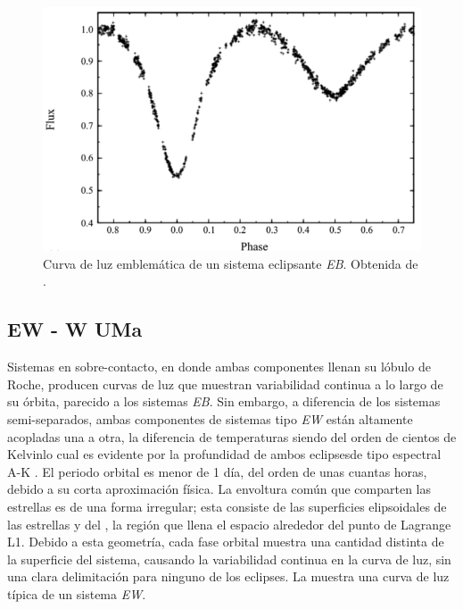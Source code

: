 \begin{figure}[!ht]
	\centering
	\includegraphics[scale=0.63]{Introduccion/Figures/Figura EB Curva_Modelling of WUMa Stars.png}
	\caption{Curva de luz emblemática de un sistema eclipsante
	\textit{EB}. Obtenida de
	\autocite{skelton_modelling_wuma_variable_stars_2009}.}
	\label{figuraEBCurvaLuz}
\end{figure}

\subsection{EW - W UMa}

Sistemas en sobre-contacto, en donde ambas componentes llenan su lóbulo de
Roche, producen curvas de luz que muestran variabilidad continua a lo largo de
su órbita, parecido a los sistemas \textit{EB}. Sin embargo, a diferencia de los
sistemas semi-separados, ambas componentes de sistemas tipo \textit{EW} están
altamente acopladas una a otra, la diferencia de temperaturas siendo del orden
de cientos de Kelvin\textemdash lo cual es evidente por la profundidad de ambos
eclipses\textemdash de tipo espectral A-K
\autocite{skelton_modelling_wuma_variable_stars_2009}. El periodo orbital es
menor de 1 día, del orden de unas cuantas horas, debido a su corta aproximación
física. La envoltura común que comparten las estrellas es de una forma
irregular; esta consiste de las superficies elipsoidales de las estrellas y del
, la región que llena el espacio alrededor del punto de Lagrange
L1. Debido a esta geometría, cada fase orbital muestra una cantidad distinta de
la superficie del sistema, causando la variabilidad continua en la curva de luz,
sin una clara delimitación para ninguno de los eclipses. La
 muestra una curva de luz típica de un sistema
\textit{EW}. 

